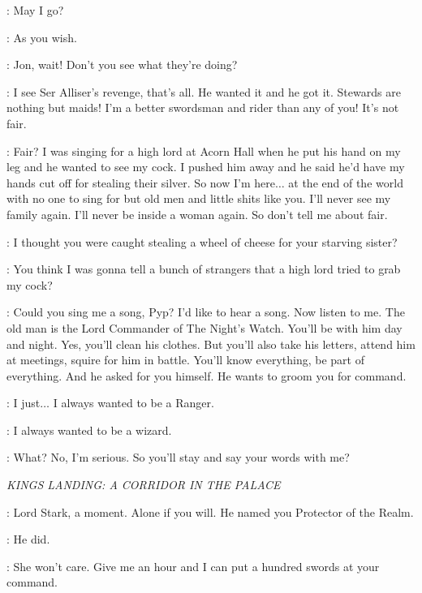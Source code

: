 \JON: May I go? 

\AEMON: As you wish. 


\SAM: Jon, wait! Don't you see what they're doing? 

\JON: I see Ser Alliser's revenge, that's all. He wanted it and he got it. Stewards are nothing but maids! I'm a better swordsman and rider than any of you! It's not fair. 

\PYP: Fair? I was singing for a high lord at Acorn Hall when he put his hand on my leg and he wanted to see my cock. I pushed him away and he said he'd have my hands cut off for stealing their silver. So now I'm here$\ldots$ at the end of the world with no one to sing for but old men and little shits like you. I'll never see my family again. I'll never be inside a woman again. So don't tell me about fair. 

\SAM: I thought you were caught stealing a wheel of cheese for your starving sister? 

\PYP: You think I was gonna tell a bunch of strangers that a high lord tried to grab my cock? 

\SAM: Could you sing me a song, Pyp? I'd like to hear a song.  Now listen to me. The old man is the Lord Commander of The Night's Watch. You'll be with him day and night. Yes, you'll clean his clothes. But you'll also take his letters, attend him at meetings, squire for him in battle. You'll know everything, be part of everything. And he asked for you himself. He wants to groom you for command. 

\JON: I just$\ldots$ I always wanted to be a Ranger. 

\SAM: I always wanted to be a wizard. 


\SAM: What? No, I'm serious. So you'll stay and say your words with me? 


\scene

\textit{KINGS LANDING: A CORRIDOR IN THE PALACE} 


\RENLY: Lord Stark, a moment. Alone if you will.  He named you Protector of the Realm. 

\NED: He did. 

\RENLY: She won't care. Give me an hour and I can put a hundred swords at your command. 

